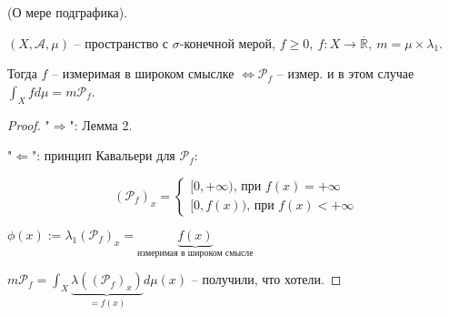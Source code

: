 \begin{theorem}
   (О мере подграфика).
   
   $(X, \mathcal{A}, \mu)$ -- пространство с $\sigma$-конечной мерой, $f \geq 0, \ f : X \rightarrow \overline{\mathbb{R}}, \ m = \mu \times \lambda_1$.

   Тогда $f$ -- измеримая в широком смыслке $\Leftrightarrow \mathcal{P}_f$ -- измер. и в этом случае $\int_X {f d \mu} = m \mathcal{P}_f$.
\end{theorem}
\begin{proof}
    "$\Rightarrow$": Лемма 2.

    "$\Leftarrow$": принцип Кавальери для $\mathcal{P}_f$:

    \begin{equation}
        (\mathcal{P}_f)_x =
        \begin{cases}
            [0, +\infty) \text{, при } f(x) = +\infty \\
            [0, f(x)) \text{, при } f(x) < +\infty
        \end{cases}
    \end{equation}

    $\phi(x) := \lambda_1 (\mathcal{P}_f)_x = \underbrace{f(x)}_{\text{измеримая в широком смысле}}$

    $m \mathcal{P}_f = \int_X {\underbrace{\lambda \left( (\mathcal{P}_f)_x \right)}_{= f(x)} d \mu (x)}$ -- получили, что хотели.
\end{proof}

